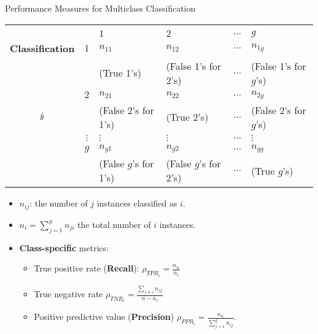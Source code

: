 \documentclass[11pt,compress,t,notes=noshow, xcolor=table]{beamer}
\begin{document}
\begin{vbframe}{Performance Measures for Multiclass Classification}
	\footnotesize{
		\begin{center}
			\tiny
			\begin{tabular}{cc|>{\centering\arraybackslash}p{8em}>{\centering\arraybackslash}p{8em}>{\centering\arraybackslash}p{5em}>{\centering\arraybackslash}p{8em}}
				& & \multicolumn{4}{c}{\bfseries True Class $y$} \\
				& & $1$ & $2$ & $\ldots$ & $g$  \\
				\hline
				\bfseries Classification     & $1$ & $n_{11}$  &  $n_{12}$  & $\ldots$ &  $n_{1g}$ \\
				& & (True 1's) & (False 1's for 2's) & $\ldots$ &  (False 1's for $g$'s)  \\
				& $2$ &  $n_{21}$  &  $n_{22}$  & $\ldots$ & $n_{2g}$  \\
				$\hat{y}$ & & (False 2's for 1's) & (True 2's) & $\ldots$ &  (False 2's for $g$'s)  \\
				& $\vdots$ & $\vdots$ & $\vdots$ & $\ldots$ & $\vdots$ \\
				& $g$ & $n_{g1}$ & $n_{g2}$  & $\ldots$ &  $n_{gg}$\\
				& & (False $g$'s for 1's) & (False $g$'s for 2's) & $\ldots$ &  (True $g$'s)  \\
			\end{tabular}
		\end{center}
		
		\begin{itemize}
			\item $n_{ij}$: the number of $j$ instances classified as $i$.
            \vspace{5pt}

            \item $n_i = \sum_{j=1}^g n_{ji}$ the total number of $i$ instances.
            \vspace{5pt}

            \item \textbf{Class-specific} metrics:
            \begin{itemize}
                \footnotesize 
                
                \item True positive rate (\textbf{Recall}): $\rho_{TPR_i} = \frac{n_{ii}}{n_i}$
                \vspace{5pt}

                \item True negative rate $\rho_{TNR_i} = \frac{\sum_{j\neq i}n_{jj}}{n-n_i}$ 
                \vspace{5pt}

                \item Positive predictive value (\textbf{Precision}) $\rho_{PPR_i} = \frac{n_{ii}}{\sum_{j=1}^g n_{ij}}$.
                
            \end{itemize}

		\end{itemize}
	}
\end{vbframe}
\end{document}
